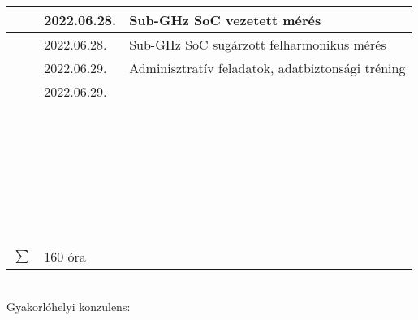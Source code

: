 \documentclass[10pt,a4paper,oneside]{report}
\newcounter{magicrownumbers}
\newcommand\rownum{\stepcounter{magicrownumbers}\arabic{magicrownumbers}}
\begin{document}
\begin{table}[h!]
\begin{tabular}{| c | p{3 cm} | p{10 cm} |}
	\rownum & 2022.06.28. & Sub-GHz SoC vezetett mérés \\ \hline
	\rownum & 2022.06.28. & Sub-GHz SoC sugárzott felharmonikus mérés \\ \hline
	\rownum & 2022.06.29. & Adminisztratív feladatok, adatbiztonsági tréning \\ \hline
	\rownum & 2022.06.29. &  \\ \hline
	\rownum &  &  \\ \hline
	\rownum &  &  \\ \hline
	\rownum &  &  \\ \hline
	\rownum &  &  \\ \hline
	\rownum &  &  \\ \hline
	\rownum &  &  \\ \hline
	\rownum &  &  \\ \hline
	\rownum &  &  \\ \hline
	\rownum &  &  \\ \hline
	\rownum &  &  \\ \hline
	\rownum &  &  \\ \hline
	\rownum &  &  \\ \hline
	\rownum &  &  \\ \hline
	\rownum &  &  \\ \hline
	\rownum &  &  \\ \hline
	\rownum &  &  \\ \hline
	\rownum &  &  \\ \hline
	\rownum &  &  \\ \hline
	\rownum &  &  \\ \hline
	\rownum &  &  \\ \hline
	\rownum &  &  \\ \hline
	\rownum &  &  \\ \hline
	\rownum &  &  \\ \hline
	\rownum &  &  \\ \hline
	\rownum &  &  \\ \hline
	\rownum &  &  \\ \hline
	\rownum &  &  \\ \hline
	\rownum &  &  \\ \hline
	\rownum &  &  \\ \hline
	$\sum$ & 160 óra& \\ \hline
	\end{tabular}
\end{table}
\vspace{.5 cm} \\
Gyakorlóhelyi konzulens:
\end{document}
